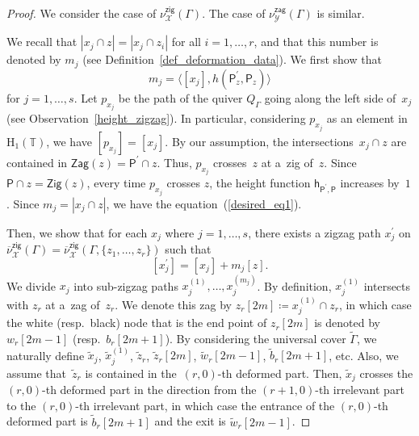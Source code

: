 \documentclass[pdftex]{sigma}%
\numberwithin{equation}{section}
\numberwithin{figure}{section}
\numberwithin{table}{section}
\newcommand{\TT}{\mathbb{T}}
\newcommand{\rmH}{\mathrm{H}}
\newcommand{\calX}{\mathcal{X}}
\newcommand{\calY}{\mathcal{Y}}
\newcommand{\sfh}{\mathsf{h}}
\newcommand{\sfP}{\mathsf{P}}
\newcommand{\Zig}{\mathsf{Zig}}
\newcommand{\Zag}{\mathsf{Zag}}
\newcommand{\zig}{\mathsf{zig}}
\newcommand{\zag}{\mathsf{zag}}
\begin{document}
\begin{proof}We consider the case of $\nu^\zig_\calX(\Gamma)$. The case of $\nu^\zag_\calY(\Gamma)$ is similar.

We recall that $|x_j\cap z|=|x_j\cap z_i|$ for all $i=1,\dots,r$, and that this number is denoted by $m_j$ (see Definition~\ref{def_deformation_data}).
We first show that
\begin{equation}\label{desired_eq1}
m_j=\langle [x_j],h(\sfP_z^\prime,\sfP_z)\rangle
\end{equation}
for $j=1,\dots,s$. Let $p_{x_j}$ be the path of the quiver $Q_\Gamma$ going along the left side of~$x_j$ (see Observation~\ref{height_zigzag}).
In particular, considering $p_{x_j}$ as an element in $\rmH_1(\TT)$, we have $[p_{x_j}]=[x_j]$.
By our assumption, the intersections~$x_j\cap z$ are contained in $\Zag(z)=\sfP^\prime\cap z$.
Thus, $p_{x_j}$ crosses~$z$ at a~zig of~$z$.
Since $\sfP\cap z=\Zig(z)$, every time $p_{x_j}$ crosses $z$, the height function $\sfh_{\sfP^\prime,\sfP}$ increases by~$1$.
Since $m_j=|x_j\cap z|$, we have the equation~(\ref{desired_eq1}).

Then, we show that for each $x_j$ where $j=1,\dots,s$, there exists a zigzag path $x^{\prime}_j$ on $\overline{\nu}_\calX^\zig(\Gamma)=\overline{\nu}_\calX^\zig(\Gamma,\{z_1,\dots,z_r\})$ such that
\begin{equation}\label{desired_eq2}
[x^{\prime}_j]=[x_j]+m_j[z].
\end{equation}
We divide $x_j$ into sub-zigzag paths $x_j^{(1)},\dots,x_j^{(m_j)}$. By definition, $x_j^{(1)}$ intersects with $z_r$ at a~zag of~$z_r$.
We denote this zag by $z_r[2m]\coloneqq x_j^{(1)}\cap z_r$, in which case the white (resp.\ black) node that is the end point of $z_r[2m]$ is denoted by $w_r[2m-1]$ (resp.~$b_r[2m+1]$).
By considering the universal cover $\widetilde{\Gamma}$, we naturally define $\widetilde{x}_j$, $\widetilde{x}_j^{(1)}$, $\widetilde{z}_r$, $\widetilde{z}_r[2m]$, $\widetilde{w}_r[2m-1]$, $\widetilde{b}_r[2m+1]$, etc.
Also, we assume that~$\widetilde{z}_r$ is contained in the~$(r,0)$-th deformed part.
Then, $\widetilde{x}_j$ crosses the $(r,0)$-th deformed part in the direction from the $(r+1,0)$-th irrelevant part to the $(r,0)$-th irrelevant part,
in which case the entrance of the $(r,0)$-th deformed part is $\widetilde{b}_r[2m+1]$ and the exit is $\widetilde{w}_r[2m-1]$.


\end{proof}
\end{document}

